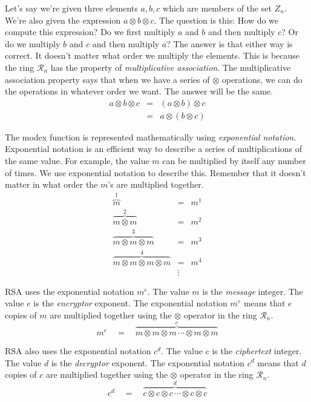 
Let's say we're given three elements $a,b,c$ which are members of the set $Z_n$.
We're also given the expression $a \otimes b \otimes c$.
The question is this:  How do we compute this expression?
Do we first multiply $a$ and $b$ and then multiply $c$?
Or do we multiply $b$ and $c$ and then multiply $a$?
The answer is that either way is correct.
It doesn't matter what order we multiply the elements.
This is because the ring $\mathcal{R}_n$ has the property of \emph{multiplicative association}.
The multiplicative association property says that
when we have a series of $\otimes$ operations,
we can do the operations in whatever order we want.
The answer will be the same.
\begin{eqnarray*}
  a \otimes b \otimes c  &=&  (a \otimes b) \otimes c \\
                         &=&  a \otimes (b \otimes c)
\end{eqnarray*}

The modex function is represented mathematically using \emph{exponential notation}.
Exponential notation is an efficient way to describe a series of multiplications of the same value.
For example, the value $m$ can be multiplied by itself any number of times.
We use exponential notation to describe this.
Remember that it doesn't matter in what order the $m$'s are multiplied together.
\begin{eqnarray*}
  \overbrace{m}^1  &=&  m^1  \\
  \overbrace{m \otimes m}^2  &=&  m^2  \\
  \overbrace{m \otimes m \otimes m}^3 &=&  m^3  \\
  \overbrace{m \otimes m \otimes m \otimes m}^4 &=&  m^4  \\
  &\vdots&
\end{eqnarray*}

RSA uses the exponential notation $m^e$.
The value $m$ is the \emph{message} integer.
The value $e$ is the \emph{encryptor} exponent.
The exponential notation $m^e$ means that $e$ copies of $m$ are multiplied together
using the $\otimes$ operator in the ring $\mathcal{R}_n$.
\[ m^e \quad = \quad \overbrace{m \otimes m \otimes m \, \cdots \otimes m \otimes m}^e \]

RSA also uses the exponential notation $c^d$.
The value $c$ is the \emph{ciphertext} integer.
The value $d$ is the \emph{decryptor} exponent.
The exponential notation $c^d$ means that $d$ copies of $c$ are multiplied together
using the $\otimes$ operator in the ring $\mathcal{R}_n$.
\[ c^d \quad = \quad \overbrace{c \otimes c \otimes c \, \cdots \otimes c \otimes c}^d \]

